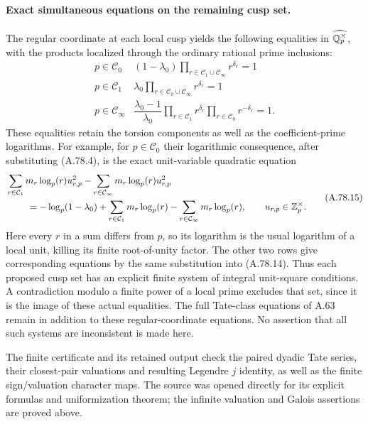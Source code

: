 \paragraph{Exact simultaneous equations on the remaining cusp set.}
The regular coordinate at each local cusp yields the following
equalities in $\widehat{\mathbb Q_p^\times}$, with the products
localized through the ordinary rational prime inclusions:
\[
\begin{array}{c|c}
 p\in\mathcal C_0&
 (1-\lambda_0)\displaystyle\prod_{r\in\mathcal C_1\cup\mathcal C_\infty}
                                      r^{\delta_r}=1\\[2mm]
 p\in\mathcal C_1&
 \lambda_0\displaystyle\prod_{r\in\mathcal C_0\cup\mathcal C_\infty}
                                      r^{\delta_r}=1\\[2mm]
 p\in\mathcal C_\infty&
 \dfrac{\lambda_0-1}{\lambda_0}
       \displaystyle\prod_{r\in\mathcal C_1}r^{\delta_r}
       \prod_{r\in\mathcal C_0}r^{-\delta_r}=1.
\end{array}
\tag{A.78.14}
\]
These equalities retain the torsion components as well as
the coefficient-prime logarithms.
For example, for $p\in\mathcal C_0$ their logarithmic
consequence, after substituting (A.78.4), is the exact
unit-variable quadratic equation
\[
 \begin{aligned}
 &\sum_{r\in\mathcal C_1}m_r\log_p(r)u_{r,p}^2
 -\sum_{r\in\mathcal C_\infty}m_r\log_p(r)u_{r,p}^2\\
 &\hspace{8mm}=-\log_p(1-\lambda_0)
   +\sum_{r\in\mathcal C_1}m_r\log_p(r)
   -\sum_{r\in\mathcal C_\infty}m_r\log_p(r),
 \qquad u_{r,p}\in\mathbb Z_p^\times.
 \end{aligned}
\tag{A.78.15}
\]
Here every $r$ in a sum differs from $p$, so its logarithm
is the usual logarithm of a local unit, killing its finite
root-of-unity factor.  The other two rows give corresponding
equations by the same substitution into (A.78.14).
Thus each proposed cusp set has an explicit finite system
of integral unit-square conditions.  A contradiction modulo
a finite power of a local prime excludes that set, since it
is the image of these actual equalities.  The full Tate-class
equations of A.63 remain in addition to these regular-coordinate
equations.  No assertion that all such systems are inconsistent
is made here.

\noindent The finite certificate
and its retained output check the paired dyadic Tate series,
their closest-pair valuations and resulting Legendre $j$
identity, as well as the finite sign/valuation character maps.
The source \cite{LegTate1995} was opened directly for its
explicit formulas and uniformization theorem; the infinite
valuation and Galois assertions are proved above.
